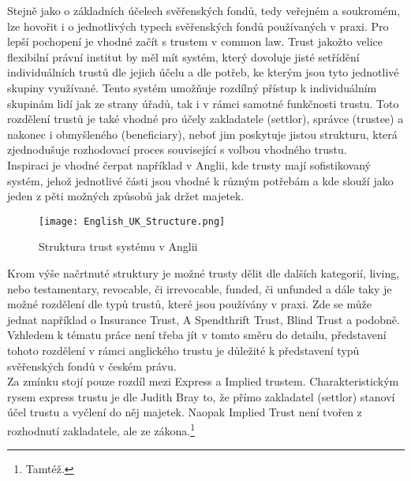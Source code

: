\documentclass{article}
\begin{document}
Stejně jako o základních účelech svěřenských fondů, tedy veřejném a soukro\-mém, lze hovořit i o jednotlivých typech svěřenských fondů používaných v praxi. Pro lepší pochopení je vhodné začít s trustem v common law. Trust jakožto velice flexibilní právní institut by měl mít systém, který dovoluje jisté setřídění individuálních trustů dle jejich účelu a dle potřeb, ke kterým jsou tyto jednotlivé skupiny využívané. Tento systém umožňuje rozdílný přístup k individuálním skupinám lidí jak ze strany úřadů, tak i v rámci samotné funkčnosti trustu. Toto rozdělení trustů je také vhodné pro účely zakladatele (settlor), správce (trustee) a nakonec i obmyšleného (beneficiary), neboť jim poskytuje jistou strukturu, která zjednodušuje rozhodovací proces související s volbou vhodného trustu.\\

Inspiraci je vhodné čerpat například v Anglii, kde trusty mají sofistikovaný systém, jehož jednotlivé části jsou vhodné k různým potřebám a kde slouží jako jeden z pěti možných způsobů jak držet majetek.\\

\begin{figure}[h]
\centering
\texttt{[image: English\_UK\_Structure.png]}
\caption{Struktura trust systému v Anglii}
\label{fig:struktura}
\end{figure}

Krom výše načrtnuté struktury je možné trusty dělit dle dalších kategorií, living, nebo testamentary, revocable, či irrevocable, funded, či unfunded a dále taky je možné rozdělení dle typů trustů, které jsou používány v praxi. Zde se může jednat například o Insurance Trust, A Spendthrift Trust, Blind Trust a podobně. Vzhledem k tématu práce není třeba jít v tomto směru do detailu, představení tohoto rozdělení v rámci anglického trustu je důležité k představení typů svěřenských fondů v českém právu.\\


Za zmínku stojí pouze rozdíl mezi Express a Implied trustem. Charakteristickým rysem express trustu je dle Judith Bray to, že přímo zakladatel (settlor) stanoví účel trustu a vyčlení do něj majetek. Naopak Implied Trust není tvořen z rozhodnutí zakladatele, ale ze zákona.\footnote{Tamtéž.}\\
\end{document}
